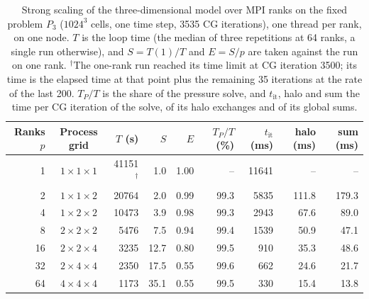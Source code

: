 \begin{table}[htbp]
\centering
\small
\begin{tabular}{rcrrrrrrr}
\toprule
Ranks $p$ & Process grid & $T$ (s) & $S$ & $E$ & $T_P/T$ (\%) & $t_{\mathrm{it}}$ (ms) & halo (ms) & sum (ms) \\
\midrule
1 & $1\times1\times1$ & 41151$^\dagger$ & 1.0 & 1.00 & -- & 11641 & -- & -- \\
2 & $1\times1\times2$ & 20764 & 2.0 & 0.99 & 99.3 & 5835 & 111.8 & 179.3 \\
4 & $1\times2\times2$ & 10473 & 3.9 & 0.98 & 99.3 & 2943 & 67.6 & 89.0 \\
8 & $2\times2\times2$ & 5476 & 7.5 & 0.94 & 99.4 & 1539 & 50.9 & 47.1 \\
16 & $2\times2\times4$ & 3235 & 12.7 & 0.80 & 99.5 & 910 & 35.3 & 48.6 \\
32 & $2\times4\times4$ & 2350 & 17.5 & 0.55 & 99.6 & 662 & 24.6 & 21.7 \\
64 & $4\times4\times4$ & 1173 & 35.1 & 0.55 & 99.5 & 330 & 15.4 & 13.8 \\
\bottomrule
\end{tabular}
\caption{Strong scaling of the three-dimensional model over MPI ranks on the fixed problem $P_3$ ($1024^3$ cells, one time step, 3535 CG iterations), one thread per rank, on one node. $T$ is the loop time (the median of three repetitions at 64 ranks, a single run otherwise), and $S=T(1)/T$ and $E=S/p$ are taken against the run on one rank. $^\dagger$The one-rank run reached its time limit at CG iteration 3500; its time is the elapsed time at that point plus the remaining 35 iterations at the rate of the last 200. $T_P/T$ is the share of the pressure solve, and $t_{\mathrm{it}}$, halo and sum the time per CG iteration of the solve, of its halo exchanges and of its global sums.}
\label{tab:strong-3d}
\end{table}
